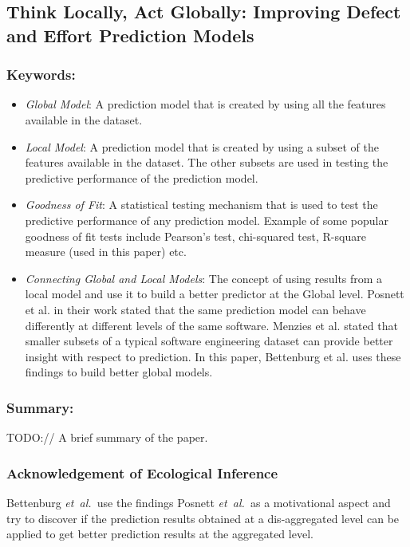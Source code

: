 \documentclass{sig-alternate-05-2015}
\newcommand{\etal}{\mbox{\emph{et al.\ }}}
\begin{document}
\subsection{Think Locally, Act Globally: Improving Defect and Effort Prediction Models \cite{Bettenburg:2012}}

\subsubsection{Keywords:}
\begin{itemize}
\item \emph{Global Model}: A prediction model that is created by using all the features available in the dataset.
\item \emph{Local Model}:  A prediction model that is created by using a subset of the features available in the dataset. The other subsets are used in testing the predictive performance of the prediction model.
\item \emph{Goodness of Fit}: A statistical testing mechanism that is used to test the predictive performance of any prediction model. Example of some popular goodness of fit tests include Pearson's test, chi-squared test, R-square measure (used in this paper) etc.
\item \emph{Connecting Global and Local Models}: The concept of using results from a local model and use it to build a better predictor at the Global level. Posnett et al. in their work \cite{Posnett:2011} stated that the same prediction model can behave differently at different levels of the same software. Menzies et al. \cite{Menzies:2011} stated that smaller subsets of a typical software engineering dataset can provide better insight with respect to prediction. In this paper, Bettenburg et al. uses these findings to build better global models.
\end{itemize} 

\subsubsection{Summary:}
TODO:// A brief summary of the paper.

\subsubsection{Acknowledgement of Ecological Inference}
Bettenburg \etal use the findings Posnett \etal as a motivational aspect and try to discover if the prediction results obtained at a dis-aggregated level can be applied to get better prediction results at the aggregated level.
\end{document}
